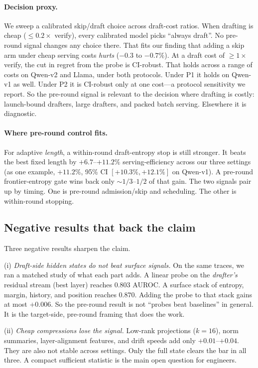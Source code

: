 \documentclass[11pt]{article}
\begin{document}
\paragraph{Decision proxy.} We sweep a calibrated skip/draft choice across
draft-cost ratios. When drafting is cheap ($\le0.2\times$ verify), every
calibrated model picks ``always draft''. No pre-round signal changes any
choice there. That fits our finding that adding a skip arm under cheap serving
costs \emph{hurts} ($-0.3$ to $-0.7\%$). At a draft cost of $\ge 1\times$
verify, the cut in regret from the probe is CI-robust. That holds across a
range of costs on Qwen-v2 and Llama, under both protocols. Under P1 it holds
on Qwen-v1 as well. Under P2 it is CI-robust only at one cost---a protocol
sensitivity we report. So the pre-round signal is relevant to the decision
where drafting is costly: launch-bound drafters, large drafters, and packed
batch serving. Elsewhere it is diagnostic.

\paragraph{Where pre-round control fits.} For adaptive \emph{length}, a
within-round draft-entropy stop is still stronger. It beats the best fixed
length by $+6.7$--$+11.2\%$ serving-efficiency across our three settings (as
one example, $+11.2\%$, 95\% CI $[+10.3\%, +12.1\%]$ on Qwen-v1). A pre-round
frontier-entropy gate wins back only ${\sim}1/3$--$1/2$ of that gain. The two
signals pair up by timing. One is
pre-round admission/skip and scheduling. The other is within-round stopping.

\subsection{Negative results that back the claim}
\label{sec:negatives}

Three negative results sharpen the claim.

(i) \emph{Draft-side hidden states do not beat surface signals.} On the same
traces, we ran a matched study of what each part adds. A linear probe on the
\emph{drafter's} residual stream (best layer) reaches $0.803$ AUROC. A surface
stack of entropy, margin, history, and position reaches $0.870$. Adding the
probe to that stack gains at most $+0.006$. So the pre-round result is not
``probes beat baselines'' in general. It is the target-side, pre-round framing
that does the work.

(ii) \emph{Cheap compressions lose the signal.} Low-rank projections
($k{=}16$), norm summaries, layer-alignment features, and drift speeds add
only $+0.01$--$+0.04$. They are also not stable across settings. Only the full
state clears the bar in all three. A compact sufficient statistic is the main
open question for engineers.
\end{document}
